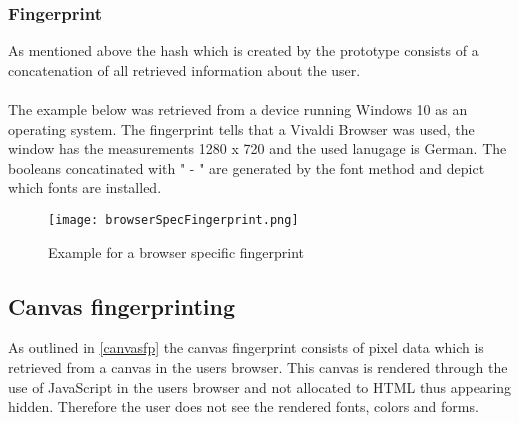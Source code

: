 \subsubsection{Fingerprint}
As mentioned above the hash which is created by the prototype consists of a concatenation of all retrieved information about the user.\\\\
The example below was retrieved from a device running Windows 10 as an operating system. The fingerprint tells that a Vivaldi Browser was used, the window has the measurements 1280 x 720 and the used lanugage is German. The booleans concatinated with " - " are generated by the font method and depict which fonts are installed.
\begin{figure}[H]
	\centering
	\texttt{[image: browserSpecFingerprint.png]}
	\caption{Example for a browser specific fingerprint\\}
	\label{fig:specFP}
\end{figure}

\subsection{Canvas fingerprinting} \label{sec:codeCanvas}

As outlined in \autoref{canvasfp} the canvas fingerprint consists of pixel data which is retrieved from a canvas in the users browser. This canvas is rendered through the use of JavaScript in the users browser and not allocated to HTML thus appearing hidden. Therefore the user does not see the rendered fonts, colors and forms.\\

